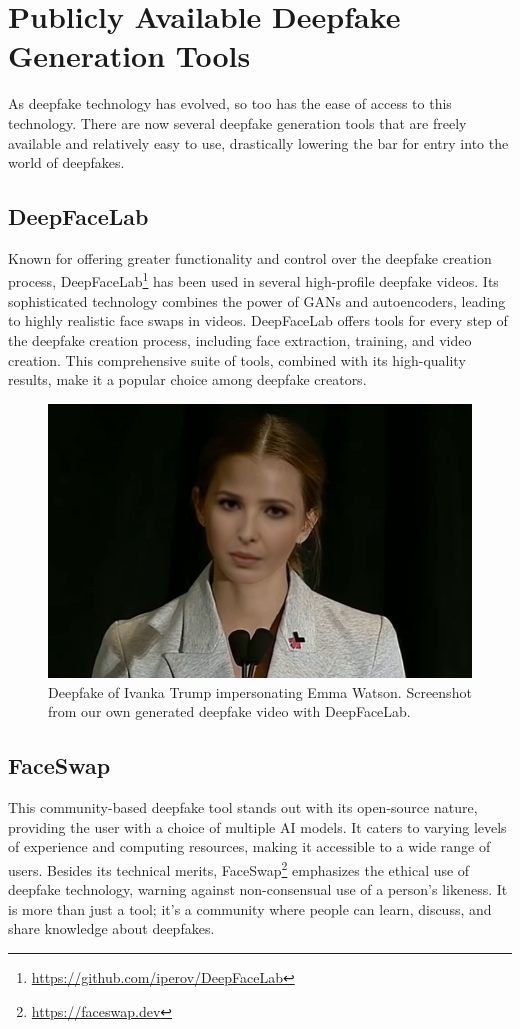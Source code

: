 \section{Publicly Available Deepfake Generation Tools}\label{chapter:publicly}
As deepfake technology has evolved, so too has the ease of access to this technology.
There are now several deepfake generation tools that are freely available and relatively
easy to use, drastically lowering the bar for entry into the world of deepfakes.

\subsection{DeepFaceLab}
Known for offering greater functionality and control over the deepfake creation
process, DeepFaceLab\footnote{\url{https://github.com/iperov/DeepFaceLab}}
has been used in several high-profile deepfake videos.
Its sophisticated technology combines the power of \ac{GAN}s and autoencoders,
leading to highly realistic face swaps in videos. DeepFaceLab offers tools
for every step of the deepfake creation process, including face extraction,
training, and video creation. This comprehensive suite of tools, combined
with its high-quality results, make it a popular choice among deepfake creators.

\begin{figure}[hb]
	\centering
	\includegraphics[scale=0.36]{figures/ivanka-deepfacelab}
	\caption{Deepfake of Ivanka Trump impersonating Emma Watson. Screenshot
		from our own generated deepfake video with DeepFaceLab.} %
\end{figure}

\subsection{FaceSwap}
This community-based deepfake tool stands out with its open-source nature,
providing the user with a choice of multiple \ac{AI} models. It caters to
varying levels of experience and computing resources, making it accessible
to a wide range of users. Besides its technical merits,
FaceSwap\footnote{\url{https://faceswap.dev}} emphasizes the ethical use
of deepfake technology, warning against non-consensual use of a person's
likeness. It is more than just a tool; it's a community where people can
learn, discuss, and share knowledge about deepfakes.

